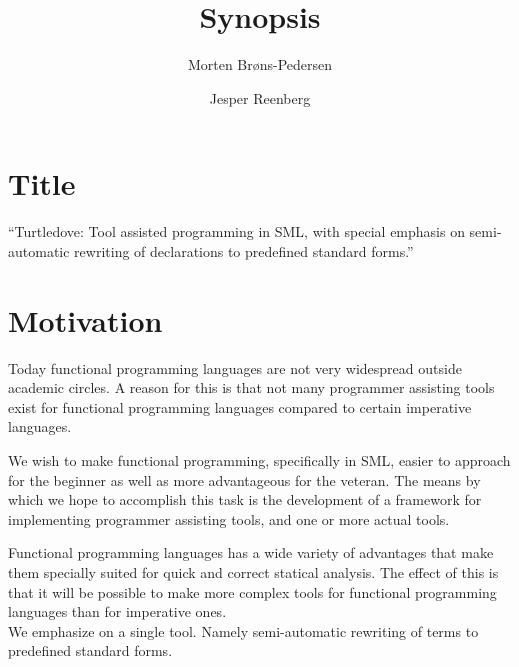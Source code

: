 \documentclass[a4paper,11pt,fleqn]{article}
\author{Morten Brøns-Pedersen \and Jesper Reenberg}
\title{Synopsis}
\begin{document}
\maketitle

\section{Title}
``Turtledove: Tool assisted programming in SML, with special emphasis on semi-automatic rewriting of
declarations to predefined standard forms.''

\section{Motivation}
Today functional programming languages are not very widespread outside academic circles. A reason
for this is that not many programmer assisting tools exist for functional programming languages
compared to certain imperative languages.

We wish to make functional programming, specifically in SML, easier to approach for the beginner as
well as more advantageous for the veteran. The means by which we hope to accomplish this task is the
development of a framework for implementing programmer assisting tools, and one or more actual
tools.

Functional programming languages has a wide variety of advantages that make them specially suited
for quick and correct statical analysis. The effect of this is that it will be possible to make more
complex tools for functional programming languages than for imperative ones.
\\

We emphasize on a single tool. Namely semi-automatic rewriting of terms to predefined standard
forms. 
\end{document}
